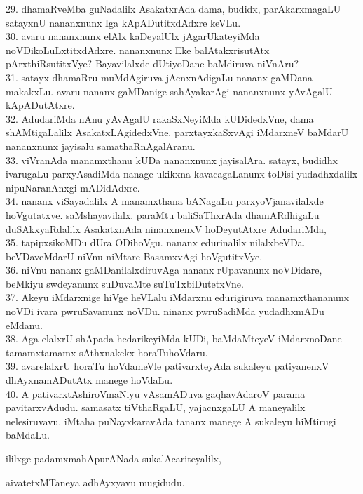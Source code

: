 \documentclass{article}
\begin{document}
29. dhamaRveMba guNadalilx AsakatxrAda dama, budidx, parAkarxmagaLU satayxnU nananxnunx Iga kApADutitxdAdxre keVLu.\\
30. avaru nananxnunx elAlx kaDeyalUlx jAgarUkateyiMda noVDikoLuLxtitxdAdxre. nananxnunx Eke balAtakxrisutAtx pArxthiRsutitxVye? Bayavilalxde dUtiyoDane baMdiruva niVnAru?\\
31. satayx dhamaRru muMdAgiruva jAcnxnAdigaLu nananx gaMDana makakxLu. avaru nananx gaMDanige sahAyakarAgi nananxnunx yAvAgalU kApADutAtxre.\\
32. AdudariMda nAnu yAvAgalU rakaSxNeyiMda kUDidedxVne, dama shAMtigaLalilx AsakatxLAgidedxVne. parxtayxkaSxvAgi iMdarxneV baMdarU nananxnunx jayisalu samathaRnAgalAranu.\\
33. viVranAda manamxthanu kUDa nananxnunx jayisalAra. satayx, budidhx ivarugaLu parxyAsadiMda nanage ukikxna kavacagaLanunx toDisi yudadhxdalilx nipuNaranAnxgi mADidAdxre.\\
34. nananx viSayadalilx A manamxthana bANagaLu parxyoVjanavilalxde hoVgutatxve. saMshayavilalx. paraMtu baliSaThxrAda dhamARdhigaLu duSAkxyaRdalilx AsakatxnAda ninanxnenxV hoDeyutAtxre AdudariMda,\\
35. tapipxsikoMDu dUra ODihoVgu. nananx edurinalilx nilalxbeVDa. beVDaveMdarU niVnu niMtare BasamxvAgi hoVgutitxVye.\\
36. niVnu nananx gaMDanilalxdiruvAga nananx rUpavanunx noVDidare, beMkiyu swdeyanunx suDuvaMte suTuTxbiDutetxVne.\\
37. Akeyu iMdarxnige hiVge heVLalu iMdarxnu edurigiruva manamxthananunx noVDi ivara pwruSavanunx noVDu. ninanx pwruSadiMda yudadhxmADu eMdanu.\\
38. Aga elalxrU shApada hedarikeyiMda kUDi, baMdaMteyeV iMdarxnoDane tamamxtamamx sAthxnakekx horaTuhoVdaru.\\
39. avarelalxrU horaTu hoVdameVle pativarxteyAda sukaleyu patiyanenxV dhAyxnamADutAtx manege hoVdaLu.\\
40. A pativarxtAshiroVmaNiyu vAsamADuva gaqhavAdaroV parama pavitarxvAdudu. samasatx tiVthaRgaLU, yajacnxgaLU A maneyalilx nelesiruvavu. iMtaha puNayxkaravAda tananx manege A sukaleyu hiMtirugi baMdaLu.\\

\begin{center}
ililxge padamxmahApurANada sukalAcariteyalilx,
\end{center}

\begin{center}
aivatetxMTaneya adhAyxyavu mugidudu.
\end{center}
\end{document}
